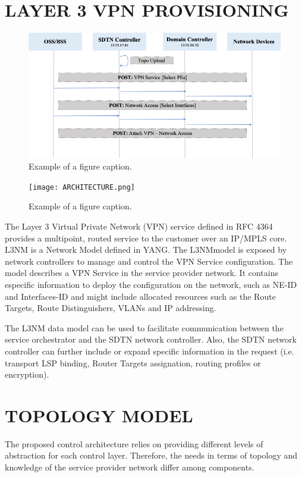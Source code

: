 \documentclass[conference]{IEEEtran}
\begin{document}
\section{LAYER 3 VPN PROVISIONING}

\begin{figure}[!h]
\centerline{\includegraphics{WORKFLOW.png}}
\caption{Example of a figure caption.}
\label{fig1}
\end{figure}


\begin{figure}[!h]
\centerline{\texttt{[image: ARCHITECTURE.png]}}
\caption{Example of a figure caption.}
\label{fig1}
\end{figure}

The Layer 3 Virtual Private Network (VPN) service defined in RFC 4364 provides a multipoint, routed service to the customer over an IP/MPLS core. 
L3NM \cite{b3} is a Network Model defined in YANG. The L3NMmodel is exposed by network controllers to manage and control the VPN Service configuration. The model describes a VPN Service in the service provider network. It contains especific information to deploy the configuration on the network, such as NE-ID and Interfaces-ID and might include allocated resources such as the Route Targets, Route Distinguishers, VLANs and IP addressing.

The L3NM data model can be used to facilitate communication between the service orchestrator and the SDTN network controller. Also, the SDTN network controller can further include or expand specific information in the  request (i.e. transport LSP binding, Router Targets assignation, routing profiles or encryption). 

\section{TOPOLOGY MODEL}

The proposed control architecture relies on providing different levels of abstraction for each control layer. Therefore, the needs in terms of topology and knowledge of the service provider network differ among components.
\end{document}
